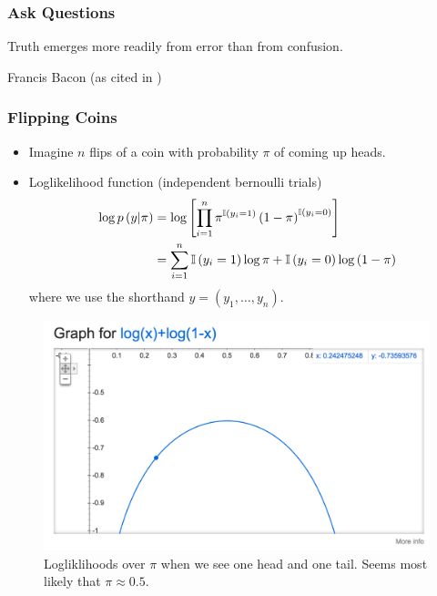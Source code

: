 \documentclass[10pt,mathserif]{beamer}
\begin{document}
\begin{frame}
  \frametitle{Ask Questions}
  \begin{displayquote}
    Truth emerges more readily from error than from confusion.
  \end{displayquote}
  Francis Bacon
  (as cited in \citep{diaconis1985theories})
\end{frame}

\begin{frame}
  \frametitle{Flipping Coins}
  \begin{itemize}
  \item Imagine $n$ flips of a coin with probability $\pi$ of coming up heads.
  \item Loglikelihood function (independent bernoulli trials)
    \begin{align*}
      \log p\left(y \vert \pi \right) &= \log \left[\prod_{i = 1}^{n} \pi^{\mathbb{I}\left({y_i = 1}\right)}\left(1 - \pi\right)^{\mathbb{I}\left({y_i = 0}\right)}\right] \\
      &= \sum_{i = 1}^{n} \mathbb{I}\left({y_i = 1}\right)\log \pi + \mathbb{I}\left({y_i = 0}\right)\log\left(1 - \pi\right)
    \end{align*}
    where we use the shorthand $y = \left(y_1, \dots, y_n\right)$.
  \end{itemize}
  \begin{figure}[ht]
    \centering
    \includegraphics[width=0.3\paperwidth]{figure/loglikelihood_bernoulli}
    \caption{Logliklihoods over $\pi$ when we see one head and one tail. Seems
      most likely that $\pi \approx 0.5$. \label{fig:loglikelihood_bernoulli} }
  \end{figure}
\end{frame}
\end{document}
